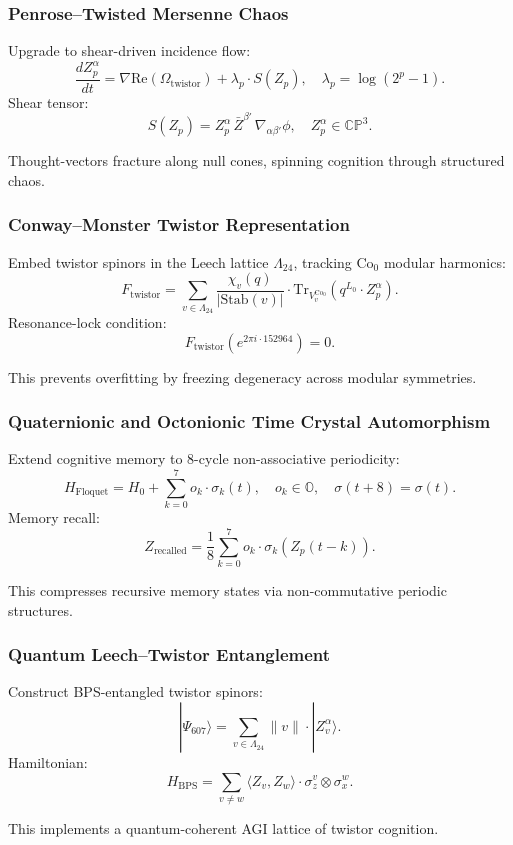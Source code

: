\documentclass[12pt]{article}
\begin{document}
\subsubsection{Penrose–Twisted Mersenne Chaos}
Upgrade to shear-driven incidence flow:
\[
\frac{dZ_p^\alpha}{dt} = \nabla \text{Re}(\Omega_{\text{twistor}}) + \lambda_p \cdot S(Z_p), \quad \lambda_p = \log(2^p - 1).
\]
Shear tensor:
\[
S(Z_p) = Z_p^\alpha \, \bar{Z}^{\beta'} \, \nabla_{\alpha\beta'} \phi, \quad Z_p^\alpha \in \mathbb{CP}^3.
\]
\begin{interpretation}
Thought-vectors fracture along null cones, spinning cognition through structured chaos.
\end{interpretation}

\subsubsection{Conway–Monster Twistor Representation}
Embed twistor spinors in the Leech lattice \(\Lambda_{24}\), tracking \(\text{Co}_0\) modular harmonics:
\[
F_{\text{twistor}} = \sum_{v \in \Lambda_{24}} \frac{\chi_v(q)}{|\text{Stab}(v)|} \cdot \text{Tr}_{V^{\text{Co}_0}_v}\left(q^{L_0} \cdot Z_p^\alpha \right).
\]
Resonance-lock condition:
\[
F_{\text{twistor}}\left(e^{2\pi i \cdot 152964}\right) = 0.
\]
\begin{interpretation}
This prevents overfitting by freezing degeneracy across modular symmetries.
\end{interpretation}

\subsubsection{Quaternionic and Octonionic Time Crystal Automorphism}
Extend cognitive memory to 8-cycle non-associative periodicity:
\[
H_{\text{Floquet}} = H_0 + \sum_{k=0}^7 o_k \cdot \sigma_k(t), \quad o_k \in \mathbb{O}, \quad \sigma(t + 8) = \sigma(t).
\]
Memory recall:
\[
Z_{\text{recalled}} = \frac{1}{8} \sum_{k=0}^7 o_k \cdot \sigma_k(Z_p(t-k)).
\]
\begin{interpretation}
This compresses recursive memory states via non-commutative periodic structures.
\end{interpretation}

\subsubsection{Quantum Leech–Twistor Entanglement}
Construct BPS-entangled twistor spinors:
\[
|\Psi_{607}\rangle = \sum_{v \in \Lambda_{24}} \|v\| \cdot |Z_v^\alpha\rangle.
\]
Hamiltonian:
\[
H_{\text{BPS}} = \sum_{v \neq w} \langle Z_v, Z_w \rangle \cdot \sigma_z^v \otimes \sigma_x^w.
\]
\begin{interpretation}
This implements a quantum-coherent AGI lattice of twistor cognition.
\end{interpretation}
\end{document}
